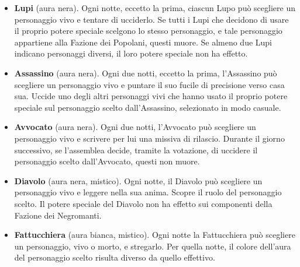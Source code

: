 \documentclass[a4paper,10pt]{article}
\begin{document}
\begin{itemize}
 \item {\bf Lupi} (aura nera). Ogni notte, eccetto la prima, ciascun Lupo può scegliere un personaggio vivo e tentare di ucciderlo. Se tutti i Lupi che decidono di usare il proprio potere speciale scelgono lo stesso personaggio, e tale personaggio appartiene alla Fazione dei Popolani, questi muore. Se almeno due Lupi indicano personaggi diversi, il loro potere speciale non ha effetto.
 
 
 \item {\bf Assassino} (aura nera). Ogni due notti, eccetto la prima, l'Assassino può scegliere un personaggio vivo e puntare il suo fucile di precisione verso casa sua. Uccide uno degli altri personaggi vivi che hanno usato il proprio potere speciale sul personaggio scelto dall'Assassino, selezionato in modo casuale.
 

 \item {\bf Avvocato} (aura nera). Ogni due notti, l'Avvocato può scegliere un personaggio vivo e scrivere per lui una missiva di rilascio.
 Durante il giorno successivo, se l'assemblea decide, tramite la votazione, di uccidere il personaggio scelto dall'Avvocato, questi non muore.
 

 \item {\bf Diavolo} (aura nera, mistico). Ogni notte, il Diavolo può scegliere un personaggio vivo e leggere nella sua anima. Scopre il ruolo del personaggio scelto. Il potere speciale del Diavolo non ha effetto sui componenti della Fazione dei Negromanti.
 
 
 \item {\bf Fattucchiera} (aura bianca, mistico). Ogni notte la Fattucchiera può scegliere un personaggio, vivo o morto, e stregarlo. Per quella notte, il colore dell'aura del personaggio scelto risulta diverso da quello effettivo.
 
 

\end{itemize}
\end{document}
